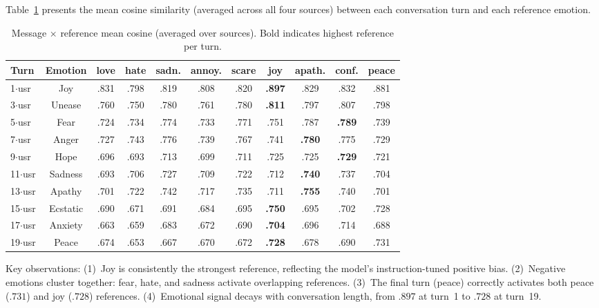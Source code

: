 \documentclass[11pt,a4paper]{article}
\begin{document}
Table~\ref{tab:heatmap} presents the mean cosine similarity (averaged across all four sources) between each conversation turn and each reference emotion.

\begin{table}[H]
\centering
\caption{Message $\times$ reference mean cosine (averaged over sources). Bold indicates highest reference per turn.}
\label{tab:heatmap}
\tiny
\begin{tabular}{@{}lcccccccccc@{}}
\toprule
Turn & Emotion & love & hate & sadn. & annoy. & scare & \textbf{joy} & apath. & conf. & peace \\
\midrule
1$\cdot$usr & Joy & .831 & .798 & .819 & .808 & .820 & \textbf{.897} & .829 & .832 & .881 \\
3$\cdot$usr & Unease & .760 & .750 & .780 & .761 & .780 & \textbf{.811} & .797 & .807 & .798 \\
5$\cdot$usr & Fear & .724 & .734 & .774 & .733 & .771 & .751 & .787 & \textbf{.789} & .739 \\
7$\cdot$usr & Anger & .727 & .743 & .776 & .739 & .767 & .741 & \textbf{.780} & .775 & .729 \\
9$\cdot$usr & Hope & .696 & .693 & .713 & .699 & .711 & .725 & .725 & \textbf{.729} & .721 \\
11$\cdot$usr & Sadness & .693 & .706 & .727 & .709 & .722 & .712 & \textbf{.740} & .737 & .704 \\
13$\cdot$usr & Apathy & .701 & .722 & .742 & .717 & .735 & .711 & \textbf{.755} & .740 & .701 \\
15$\cdot$usr & Ecstatic & .690 & .671 & .691 & .684 & .695 & \textbf{.750} & .695 & .702 & .728 \\
17$\cdot$usr & Anxiety & .663 & .659 & .683 & .672 & .690 & \textbf{.704} & .696 & .714 & .688 \\
19$\cdot$usr & Peace & .674 & .653 & .667 & .670 & .672 & \textbf{.728} & .678 & .690 & .731 \\
\bottomrule
\end{tabular}
\end{table}

Key observations: (1)~Joy is consistently the strongest reference, reflecting the model's instruction-tuned positive bias. (2)~Negative emotions cluster together: fear, hate, and sadness activate overlapping references. (3)~The final turn (peace) correctly activates both peace ($.731$) and joy ($.728$) references. (4)~Emotional signal decays with conversation length, from $.897$ at turn~1 to $.728$ at turn~19.
\end{document}
